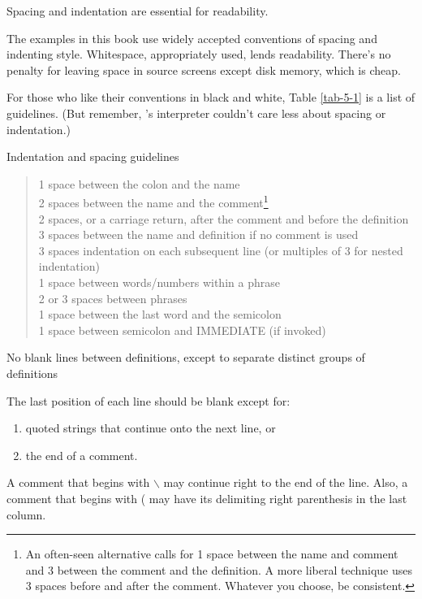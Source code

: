 \begin{tip}
Spacing and indentation are essential for readability.
\end{tip}
The examples in this book use widely accepted conventions of spacing
and indenting style.  Whitespace, appropriately used, lends readability.
There's no penalty for leaving space in source screens except disk
memory, which is cheap.

For those who like their conventions in black and white, Table \ref{tab-5-1} is
a list of guidelines.  (But remember, \Forth{}'s interpreter couldn't care
less about spacing or indentation.)

\begin{table}[bbbb]
\caption{Indentation and spacing guidelines}
\label{tab-5-1}
\medskip\blackline{0pt}\medskip
\begin{minipage}{\textwidth}
\begin{quote}
1 space between the colon and the name\\
2 spaces between the name and the comment\footnote{An often-seen
alternative calls for 1 space between the name and comment and 3
between the comment and the definition.  A more liberal technique uses
3 spaces before and after the comment.  Whatever you choose, be
consistent.}\\
2 spaces, or a carriage return, after the comment and before the definition\footnotemark[1]\\
3 spaces between the name and definition if no comment is used\\
3 spaces indentation on each subsequent line (or multiples of 3 for nested
indentation)\\
1 space between words/numbers within a phrase\\
2 or 3 spaces between phrases\\
1 space between the last word and the semicolon\\
1 space between semicolon and IMMEDIATE (if invoked)
\end{quote}
No blank lines between definitions, except to separate distinct groups of
definitions

\end{minipage}
\medskip\blackline{0pt}
\end{table}


The last position of each line should be blank except for:
\begin{enumerate}
\item quoted strings that continue onto the next line, or
\item the end of a comment.
\end{enumerate}
A comment that begins with $\backslash$ may continue right to the end of the line.
Also, a comment that begins with ( may have its delimiting right parenthesis
in the last column.

